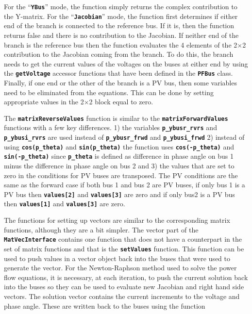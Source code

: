 \documentclass[12pt]{report} %
\begin{document}
For the ``\texttt{\textbf{YBus}}'' mode, the function simply returns the complex contribution to the Y-matrix. For the ``\texttt{\textbf{Jacobian}}'' mode, the function first determines if either end of the branch is connected to the reference bus. If it is, then the function returns false and there is no contribution to the Jacobian. If neither end of the branch is the reference bus then the function evaluates the 4 elements of the 2$\mathrm{\times}$2 contribution to the Jacobian coming from the branch. To do this, the branch needs to get the current values of the voltages on the buses at either end by using the \texttt{\textbf{getVoltage}} accessor functions that have been defined in the \texttt{\textbf{PFBus}} class. Finally, if one end or the other of the branch is a PV bus, then some variables need to be eliminated from the equations. This can be done by setting appropriate values in the 2$\mathrm{\times}$2 block equal to zero.

The \texttt{\textbf{matrixReverseValues}} function is similar to the \texttt{\textbf{matrixForwardValues}} functions with a few key differences. 1) the variables \texttt{\textbf{p\_ybusr\_rvrs}} and \texttt{\textbf{p\_ybusi\_rvrs}} are used instead of \texttt{\textbf{p\_ybusr\_frwd}} and \texttt{\textbf{p\_ybusi\_frwd}} 2) instead of using \texttt{\textbf{cos(p\_theta)}} and \texttt{\textbf{sin(p\_theta)}} the function uses \texttt{\textbf{cos(-p\_theta)}} and \texttt{\textbf{sin(-p\_theta)}} since \texttt{\textbf{p\_theta}} is defined as difference in phase angle on bus 1 minus the difference in phase angle on bus 2 and 3) the values that are set to zero in the conditions for PV buses are transposed. The PV conditions are the same as the forward case if both bus 1 and bus 2 are PV buses, if only bus 1 is a PV bus then \texttt{\textbf{values[2]}} and \texttt{\textbf{values[3]}} are zero and if only bus2 is a PV bus then \texttt{\textbf{values[1]}} and \texttt{\textbf{values[3]}} are zero.

The functions for setting up vectors are similar to the corresponding matrix functions, although they are a bit simpler. The vector part of the \texttt{\textbf{MatVecInterface}} contains one function that does not have a counterpart in the set of matrix functions and that is the \texttt{\textbf{setValues}} function. This function can be used to push values in a vector object back into the buses that were used to generate the vector. For the Newton-Raphson method used to solve the power flow equations, it is necessary, at each iteration, to push the current solution back into the buses so they can be used to evaluate new Jacobian and right hand side vectors. The solution vector contains the current increments to the voltage and phase angle. These are written back to the buses using the function
\end{document}
